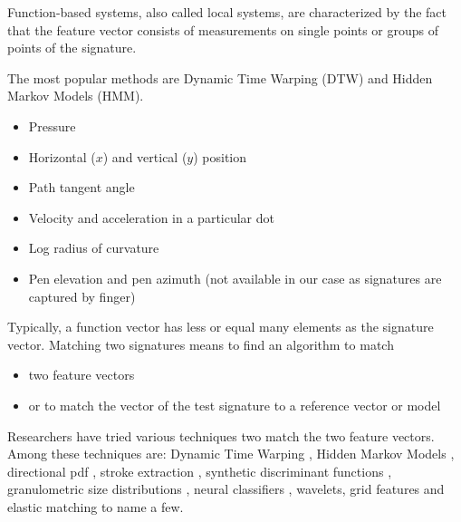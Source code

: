 \documentclass[a4paper, oneside]{csthesis}
\begin{document}


Function-based systems, also called local systems, are characterized by the fact that the feature vector consists of measurements on single points or groups of points of the signature.

The most popular methods are Dynamic Time Warping (DTW) and Hidden Markov Models (HMM).

\begin{itemize}
\item Pressure
\item Horizontal ($x$) and vertical ($y$) position
\item Path tangent angle
\item Velocity and acceleration in a particular dot
\item Log radius of curvature
\item Pen elevation and pen azimuth (not available in our case as signatures are captured by finger)
\end{itemize}

Typically, a function vector has less or equal many elements as the signature vector. Matching two signatures means to find an algorithm to match
\begin{itemize}
\item two feature vectors
\item or to match the vector of the test signature to a reference vector or model
\end{itemize}

Researchers have tried various techniques two match the two feature vectors. Among these techniques are: Dynamic Time Warping \cite{Herbst98onan} \cite{citeulike:891512}, Hidden Markov Models \cite{Justino00anoff-line}, directional pdf \cite{drouhard_1996_pr}, stroke extraction \cite{1047809}, synthetic discriminant functions \cite{Wilkinson:91}, granulometric size distributions \cite{615447}, neural classifiers \cite{Bajaj19971}, wavelets\cite{Ramesh1999217}, grid features\cite{Qi19941621} and elastic matching\cite{citeulike:941886} to name a few. \cite{PiyushShanker:2007:OSV:1274199.1274423}
\end{document}
